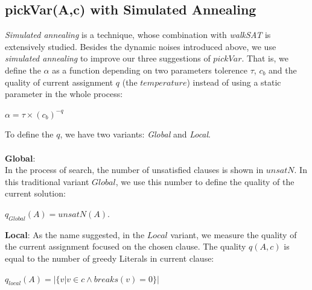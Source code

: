 \documentclass[12pt,a4paper,twoside]{scrartcl}
\numberwithin{equation}{section}
\begin{document}
\subsection{pickVar(A,c) with Simulated Annealing}
\emph{Simulated annealing} is a technique, whose combination with \emph{walkSAT} is extensively studied. Besides the dynamic noises introduced above, we use \emph{simulated annealing} to improve our three suggestions of $pickVar$. That is, we define the $\alpha$ as a function depending on two parameters tolerence $\tau$, $c_b$ and the quality of current assignment $q$ (the $temperature$) instead of using a static parameter in the whole process:
\begin{center}
 $\alpha = \tau \times (c_b)^{-q}$\\
 \end{center}
To define the $q$, we have two variants: \emph{Global} and \emph{Local}.\\
\\
\textbf{Global}:\\
In the process of search, the number of unsatisfied clauses is shown in $unsatN$. In this traditional variant $Global$, we use this number to define the quality of the current solution:
\begin{center}
 $q_{Global}(A) =unsatN(A)$.\\
\end{center}
\textbf{Local}:
As the name suggested, in the $Local$ variant, we measure the quality of the current assignment focused on the chosen clause. The quality  $q(A,c)$ is equal to the number of greedy Literals in current clause:
\begin{center}
 $q_{local}(A) =|\{ v| v \in  c \land breaks(v) = 0\}|$\\
 \end{center}
\end{document}

